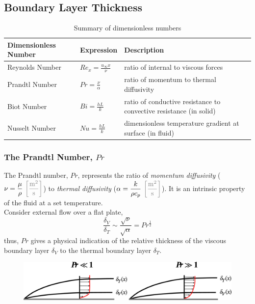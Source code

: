 \documentclass[12pt, a4paper]{article}
\begin{document}
\subsection{Boundary Layer Thickness}
\begin{table}[H]
    \centering
    \begin{tabularx}{\textwidth}{p{} p{} p{}}
    \toprule
        \textbf{Dimensionless Number} & \textbf{Expression} & \textbf{Description}  \\
    \midrule
        Reynolds Number & $\displaystyle Re_{x} = \frac{u_{\infty}x}{\nu}$ & ratio of internal to viscous forces \\ [1em]
        
        Prandtl Number & $\displaystyle Pr = \frac{\nu}{\alpha}$ & ratio of momentum to thermal diffusivity \\ [1em]
        
        Biot Number & $\displaystyle Bi = \frac{hL}{k}$ & ratio of conductive resistance to convective resistance (in solid) \\ [1em]
        
        Nusselt Number & $\displaystyle Nu = \frac{hL}{k}$ & dimensionless temperature gradient at surface (in fluid) \\
    \bottomrule
    \end{tabularx}
    \caption{Summary of dimensionless numbers}
    \label{tab:my_label}
\end{table}

\subsubsection{The Prandtl Number, $Pr$}
The Prandtl number, $Pr$, represents the ratio of \textit{momentum diffusivity} ($\displaystyle \nu = \frac{\mu}{\rho} \ {\color{gray}\bigg[ \frac{\mathrm{m}^2}{\mathrm{s}} \bigg]}$) to \textit{thermal diffusivity} ($\displaystyle \alpha = \frac{k}{\rho c_p} \ {\color{gray}\bigg[ \frac{\mathrm{m}^2}{\mathrm{s}}\bigg]}$). It is an intrinsic property of the fluid at a set temperature.\\

Consider external flow over a flat plate, 
\[
    \frac{\delta_V}{\delta_T} \sim \frac{\sqrt{\nu}}{\sqrt{\alpha}} = Pr^{\frac{1}{2}}
\]
thus, $Pr$ gives a physical indication of the relative thickness of the viscous boundary layer $\delta_V$ to the thermal boundary layer $\delta_T$.
\begin{figure}[H]
    \centering
    \includegraphics[width=.8\textwidth]{img/prandtl_number_boundary_layer.eps}
\end{figure}
\end{document}
